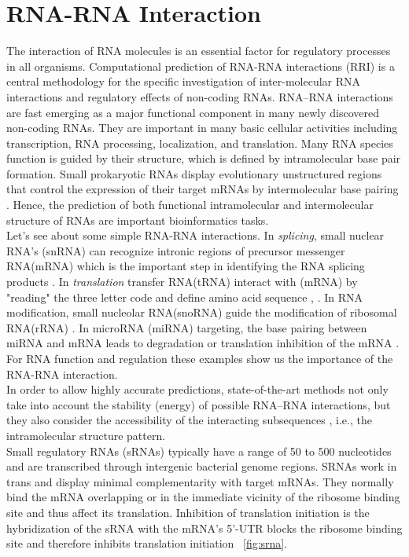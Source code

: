 \documentclass[twoside,a4paper]{report}
\numberwithin{equation}{section}
\begin{document}
	\section{RNA-RNA Interaction}
 	The interaction of RNA molecules is an essential factor for regulatory processes in all organisms. Computational prediction of RNA-RNA interactions (RRI) is a central methodology for the specific investigation of inter-molecular RNA interactions and regulatory effects of non-coding RNAs. RNA–RNA interactions are fast emerging as a major functional component in many newly discovered non-coding RNAs. They are important in many basic cellular activities including transcription, RNA processing, localization, and translation.  Many RNA species function is guided by their structure, which is defined by intramolecular base pair formation. Small prokaryotic RNAs display evolutionary unstructured regions that control the expression of their target mRNAs by intermolecular base pairing \citep{wright2013comparative}. Hence, the prediction of both functional intramolecular and intermolecular structure of RNAs are important bioinformatics tasks. \\
 	
 	Let's see about some simple RNA-RNA interactions. In \textit{splicing}, small nuclear RNA's (snRNA) can recognize intronic regions of precursor messenger RNA(mRNA) which is the important step in identifying the RNA splicing products \citep{modrek2002genomic}. In \textit{translation} transfer RNA(tRNA) interact with (mRNA) by "reading" the three letter code and define amino acid sequence \citep{selmer2006structure}, \citep{ibba2000aminoacyl}. In RNA modification, small nucleolar RNA(snoRNA) guide the modification of ribosomal RNA(rRNA) \citep{kiss2002small}. In microRNA (miRNA) targeting, the base pairing between  miRNA and mRNA leads to degradation or translation inhibition of the mRNA \citep{bartel2004micrornas}. For RNA function and regulation these examples show us the importance of the RNA-RNA interaction. \\
 		
 	In order to allow highly accurate predictions, state-of-the-art methods not only take into account the stability (energy) of possible RNA–RNA interactions, but they also consider the accessibility of the interacting subsequences \citep{umu2017comprehensive}, i.e., the intramolecular structure pattern.\\
 	
 	Small regulatory RNAs (sRNAs) typically have a range of 50 to 500 nucleotides and are transcribed through intergenic bacterial genome regions. SRNAs work in trans and display minimal complementarity with target mRNAs. They normally bind the mRNA overlapping or in the immediate vicinity of the ribosome binding site and thus affect its translation. Inhibition of translation initiation is the hybridization of the sRNA with the mRNA's 5'-UTR blocks the ribosome binding site and therefore inhibits translation initiation ~\ref{fig:srna}. \\
 	
\end{document}
